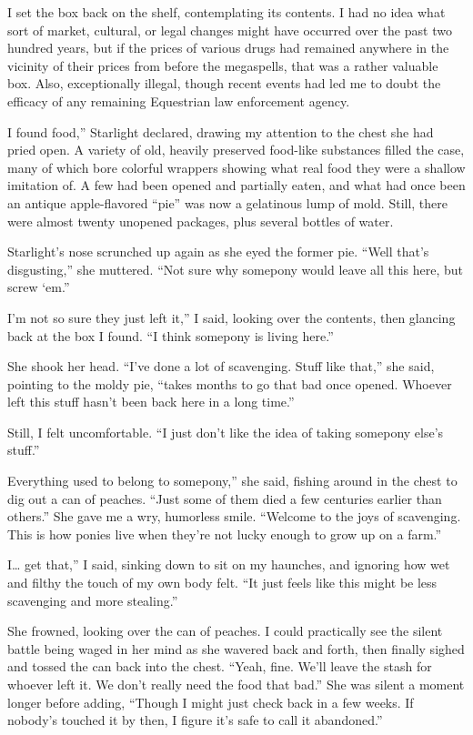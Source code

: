 I set the box back on the shelf, contemplating its contents. I had no idea what sort of market, cultural, or legal changes might have occurred over the past two hundred years, but if the prices of various drugs had remained anywhere in the vicinity of their prices from before the megaspells, that was a rather valuable box. Also, exceptionally illegal, though recent events had led me to doubt the efficacy of any remaining Equestrian law enforcement agency.

\leavevmode{}I found food,” Starlight declared, drawing my attention to the chest she had pried open. A variety of old, heavily preserved food-like substances filled the case, many of which bore colorful wrappers showing what real food they were a shallow imitation of. A few had been opened and partially eaten, and what had once been an antique apple-flavored “pie” was now a gelatinous lump of mold. Still, there were almost twenty unopened packages, plus several bottles of water.

Starlight’s nose scrunched up again as she eyed the former pie. “Well that’s disgusting,” she muttered. “Not sure why somepony would leave all this here, but screw ‘em.”

\leavevmode{}I’m not so sure they just left it,” I said, looking over the contents, then glancing back at the box I found. “I think somepony is living here.”

She shook her head. “I’ve done a lot of scavenging. Stuff like that,” she said, pointing to the moldy pie, “takes months to go that bad once opened. Whoever left this stuff hasn’t been back here in a long time.”

Still, I felt uncomfortable. “I just don’t like the idea of taking somepony else’s stuff.”

\leavevmode{}Everything used to belong to somepony,” she said, fishing around in the chest to dig out a can of peaches. “Just some of them died a few centuries earlier than others.” She gave me a wry, humorless smile. “Welcome to the joys of scavenging. This is how ponies live when they’re not lucky enough to grow up on a farm.”

\leavevmode{}I… get that,” I said, sinking down to sit on my haunches, and ignoring how wet and filthy the touch of my own body felt. “It just feels like this might be less scavenging and more stealing.”

She frowned, looking over the can of peaches. I could practically see the silent battle being waged in her mind as she wavered back and forth, then finally sighed and tossed the can back into the chest. “Yeah, fine. We’ll leave the stash for whoever left it. We don’t really need the food that bad.” She was silent a moment longer before adding, “Though I might just check back in a few weeks. If nobody’s touched it by then, I figure it’s safe to call it abandoned.”

